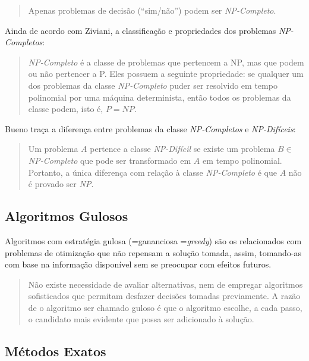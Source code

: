 \begin{quote}
Apenas problemas de decisão (“sim/não”) podem ser \emph{NP-Completo}.
\end{quote}

Ainda de acordo com Ziviani, a classificação e propriedades dos problemas \emph{NP-Completos}: 

\begin{quote}
\emph{NP-Completo} é a classe de problemas que pertencem a NP, mas que podem ou não pertencer a P. Eles possuem a seguinte propriedade: se qualquer um dos problemas da classe \emph{NP-Completo} puder ser resolvido em tempo polinomial por uma máquina determinista, então todos os problemas da classe podem, isto é, $P = NP$.
\end{quote}

Bueno traça a diferença entre problemas da classe \emph{NP-Completos} e \emph{NP-Difíceis}:

\begin{quote}
Um problema $A$ pertence a classe \emph{NP-Difícil} se existe um problema $B \in$ \emph{NP-Completo} que pode ser transformado em $A$ em tempo polinomial. Portanto, a única diferença com relação à classe \emph{NP-Completo} é que $A$ não é provado ser \emph{NP}.
\end{quote}

\subsection{Algoritmos Gulosos}
\label{gulosos}
Algoritmos com estratégia gulosa (=gananciosa =\emph{greedy}) \cite{feofiloff} são os relacionados com problemas de otimização que não repensam a solução tomada, assim, tomando-as com base na informação disponível sem se preocupar com efeitos futuros. 

\begin{quote}
Não existe necessidade de avaliar alternativas, nem de empregar algoritmos sofisticados que permitam desfazer decisões tomadas previamente. A razão de o algoritmo ser chamado guloso é que o algoritmo escolhe, a cada passo, o candidato mais evidente que possa ser adicionado à solução.
\end{quote}

\subsection{Métodos Exatos} \label{metodos-exatos}

